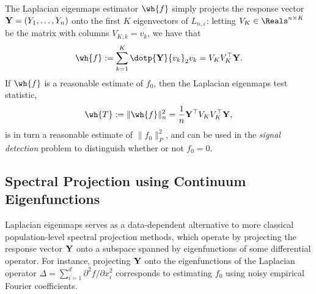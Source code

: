 The Laplacian eigenmaps estimator $\wh{f}$ simply projects the response vector ${\bf Y} = (Y_1,\ldots,Y_n)$ onto the first $K$ eigenvectors of $L_{n,\varepsilon}$: letting $V_K \in \Reals^{n \times K}$ be the matrix with columns $V_{K,k} = v_k$, we have that
\begin{equation}
\label{eqn:laplacian_eigenmaps_estimator}
\wh{f} := \sum_{k = 1}^{K} \dotp{{\bf Y}}{v_k}_{2} v_k = V_K V_K^{\top} {\bf Y}.
\end{equation} 
If $\wh{f}$ is a reasonable estimate of $f_0$, then the Laplacian eigenmaps test statistic,
\begin{equation}
\label{eqn:laplacian_eigenmaps_test}
\wh{T} := \|\wh{f}\|_n^2 = \frac{1}{n} {\bf Y}^{\top} V_K V_K^{\top} {\bf Y},
\end{equation}
is in turn a reasonable estimate of $\|f_0\|_{P}^2$, and can be used in the \emph{signal detection} problem to distinguish whether or not $f_0 = 0$.

\subsection{Spectral Projection using Continuum Eigenfunctions}
\label{subsec:spectral_projection}
Laplacian eigenmaps serves as a data-dependent alternative to more classical population-level spectral projection methods, which operate by projecting the response vector ${\bf Y}$ onto a subspace spanned by eigenfunctions of some differential operator. For instance, projecting ${\bf Y}$ onto the eigenfunctions of the Laplacian operator $\Delta = \sum_{i = 1}^{d} \partial^2f/\partial x_i^2$ corresponds to estimating $f_0$ using noisy empirical Fourier coefficients.

